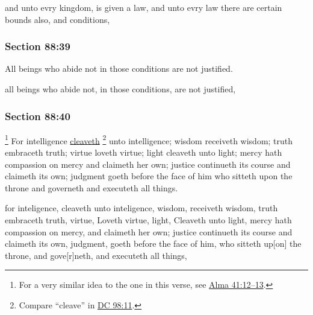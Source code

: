 		\begin{framed}
		\scriptsize
			\begin{compactdesc}
				\item[JSP] and unto evry kingdom, is given a law, and unto evry law there are certain bounds also, and conditions,
			\end{compactdesc}
		\end{framed}

	\subsubsection{Section 88:39} %
		\label{DC88-39}

		All beings who abide not in those conditions are not justified.

		\begin{framed}
		\scriptsize
			\begin{compactdesc}
				\item[JSP] all beings who abide not, in those conditions, are not justified,
			\end{compactdesc}
		\end{framed}

	\subsubsection{Section 88:40} %
		\label{DC88-40}

			\footnote{%
				For a very similar idea to the one in this verse, see \hyperref[ALMA-41-12]{Alma 41:12--13}.
				}%
		For intelligence \hyperref[CLEAVE]{cleaveth}%
			\footnote{%
				Compare ``cleave'' in \hyperref[DC98-11]{DC 98:11}.
				}
		unto intelligence; wisdom receiveth wisdom; truth embraceth truth; virtue loveth virtue; light cleaveth unto light; mercy hath compassion on mercy and claimeth her own; justice continueth its course and claimeth its own; judgment goeth before the face of him who sitteth upon the throne and governeth and executeth all things.

		\begin{framed}
		\scriptsize
			\begin{compactdesc}
				\item[JSP] for inteligence, cleaveth unto inteligence, wisdom, receiveth wisdom, truth embraceth truth, virtue, Loveth virtue, light, Cleaveth unto light, mercy hath compassion on mercy, and claimeth her own; justice continueth its course and claimeth its own, judgment, goeth before the face of him, who sitteth up[on] the throne, and gove[r]neth, and executeth all things,
			\end{compactdesc}
		\end{framed}

